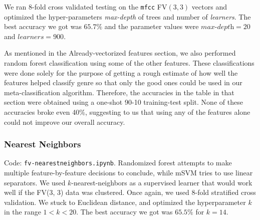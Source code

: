 \documentclass{article}
\begin{document}
We ran 8-fold cross validated testing on the \texttt{mfcc} FV$(3, 3)$ vectors and optimized
the hyper-parameters {\em max-depth} of trees and number of {\em learners}.
The best accuracy we got was $65.7\%$ and the parameter values were $\textit{max-depth} = 20$  and $\textit{learners} = 900$.

As mentioned in the Already-vectorized features section,
we also performed random forest classification using some of the other features.
These classifications were done solely for the purpose of getting a rough estimate
of how well the features helped classify genre so that only the good ones could
be used in our meta-classification algorithm.
Therefore, the accuracies in the table in that section were obtained using
a one-shot 90-10 training-test split.
None of these accuracies broke even 40\%, suggesting to us that using any of the features
alone could not improve our overall accuracy.

\subsubsection{Nearest Neighbors} \label{knn}
Code: \texttt{fv-nearestneighbors.ipynb}.
Randomized forest attempts to make multiple feature-by-feature decisions to conclude,
while mSVM tries to use linear separators.
We used $k$-nearest-neighbors as a supervised learner that would work well if the FV(3, 3) data was clustered.
Once again, we used 8-fold stratified cross validation.
We stuck to Euclidean distance, and optimized the hyperparameter $k$ in the range $1 < k < 20$.
The best accuracy we got was $65.5\%$ for $k = 14$.
\end{document}
